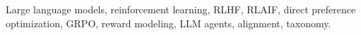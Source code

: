 \documentclass[journal]{IEEEtran}
\begin{document}
\begin{IEEEkeywords}
Large language models, reinforcement learning, RLHF, RLAIF,
direct preference optimization, GRPO, reward modeling, LLM agents,
alignment, taxonomy.
\end{IEEEkeywords}












\end{document}
